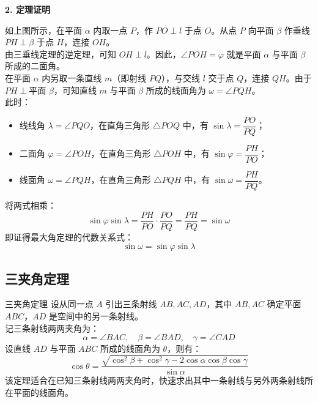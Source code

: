 \documentclass[11pt,a4paper]{ctexart}
\begin{document}
\begin{center}
\end{center}

\noindent\textbf{2. 定理证明}\par
如上图所示，在平面 $\alpha$ 内取一点 $P$，作 $PO \perp l$ 于点 $O$。从点 $P$ 向平面 $\beta$ 作垂线 $PH \perp \beta$ 于点 $H$，连接 $OH$。\\
由三垂线定理的逆定理，可知 $OH \perp l$。因此，$\angle POH = \varphi$ 就是平面 $\alpha$ 与平面 $\beta$ 所成的二面角。\\
在平面 $\alpha$ 内另取一条直线 $m$（即射线 $PQ$），与交线 $l$ 交于点 $Q$，连接 $QH$。由于 $PH \perp \text{平面 } \beta$，可知直线 $m$ 与平面 $\beta$ 所成的线面角为 $\omega = \angle PQH$。\\
此时：
\begin{itemize}
    \item 线线角 $\lambda = \angle PQO$，在直角三角形 $\triangle POQ$ 中，有 $\sin\lambda = \dfrac{PO}{PQ}$；
    \item 二面角 $\varphi = \angle POH$，在直角三角形 $\triangle POH$ 中，有 $\sin\varphi = \dfrac{PH}{PO}$；
    \item 线面角 $\omega = \angle PQH$，在直角三角形 $\triangle PQH$ 中，有 $\sin\omega = \dfrac{PH}{PQ}$。
\end{itemize}
将两式相乘：
\[ \sin\varphi \sin\lambda = \frac{PH}{PO} \cdot \frac{PO}{PQ} = \frac{PH}{PQ} = \sin\omega \]
即证得最大角定理的代数关系式：
\[ \sin\omega = \sin\varphi \sin\lambda \]

\subsection{三夹角定理}

\begin{theorembox}{三夹角定理}
设从同一点 $A$ 引出三条射线 $AB, AC, AD$，其中 $AB, AC$ 确定平面 $ABC$，$AD$ 是空间中的另一条射线。\\
记三条射线两两夹角为：
\[ \alpha = \angle BAC, \quad \beta = \angle BAD, \quad \gamma = \angle CAD \]
设直线 $AD$ 与平面 $ABC$ 所成的线面角为 $\theta$，则有：
\[ \cos\theta = \frac{\sqrt{\cos^2\beta + \cos^2\gamma - 2\cos\alpha \cos\beta \cos\gamma}}{\sin\alpha} \]
该定理适合在已知三条射线两两夹角时，快速求出其中一条射线与另外两条射线所在平面的线面角。
\end{theorembox}
\end{document}
